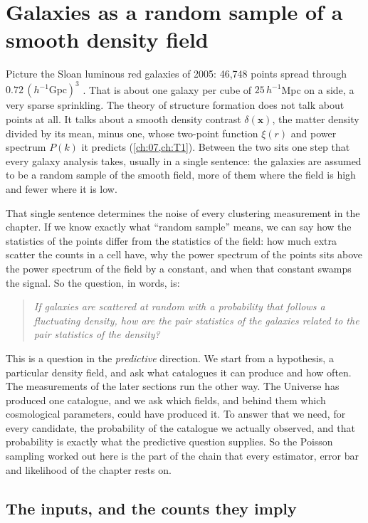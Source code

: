 \section{Galaxies as a random sample of a smooth density field}
\label{11a:sec:cox}

Picture the Sloan luminous red galaxies of 2005: 46,748 points spread through
$0.72\,(h^{-1}\mathrm{Gpc})^3$ \cite{Eisenstein2005}. That is about one galaxy per
cube of $25\,h^{-1}$Mpc on a side, a very sparse sprinkling. The theory of
structure formation does not talk about points at all. It talks about a smooth
density contrast $\delta(\bm x)$, the matter density divided by its mean, minus
one, whose two-point function $\xi(r)$ and power spectrum $P(k)$ it predicts
(\cref{ch:07,ch:T1}). Between the two sits one step that every galaxy analysis
takes, usually in a single sentence: the galaxies are assumed to be a random
sample of the smooth field, more of them where the field is high and fewer where
it is low.

That single sentence determines the noise of every clustering measurement in the
chapter. If we know exactly what ``random sample'' means, we can say how the
statistics of the points differ from the statistics of the field: how much extra
scatter the counts in a cell have, why the power spectrum of the points sits
above the power spectrum of the field by a constant, and when that constant
swamps the signal. So the question, in words, is:
\begin{quote}
\emph{If galaxies are scattered at random with a probability that follows a
fluctuating density, how are the pair statistics of the galaxies related to the
pair statistics of the density?}
\end{quote}
This is a question in the \emph{predictive} direction. We start from a hypothesis,
a particular density field, and ask what catalogues it can produce and how often.
The measurements of the later sections run the other way. The Universe has
produced one catalogue, and we ask which fields, and behind them which
cosmological parameters, could have produced it. To answer that we need, for every
candidate, the probability of the catalogue we actually observed, and that
probability is exactly what the predictive question supplies. So the Poisson
sampling worked out here is the part of the chain that every estimator, error bar
and likelihood of the chapter rests on.

\subsection{The inputs, and the counts they imply}
\label{11a:sec:cox-inputs}

